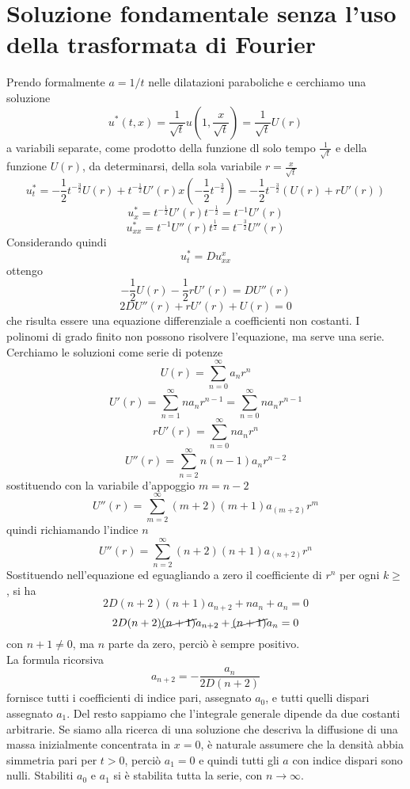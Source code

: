 \section{Soluzione fondamentale senza l'uso della trasformata di Fourier}
Prendo formalmente $a= 1/t$ nelle dilatazioni paraboliche e cerchiamo una
soluzione
\[
	u^*(t,x)= \frac{1}{\sqrt{t}}u \left( 1, \frac{x}{\sqrt{t}} \right)=
	\frac{1}{\sqrt{t}}U \left( r \right)
\]
a variabili separate, come prodotto della funzione dl solo tempo
$\frac{1}{\sqrt{t}}$ e della funzione $U(r)$, da determinarsi, della sola
variabile
$r=\frac{x}{\sqrt{t}}$
\[
	u^*_t= -\frac{1}{2}t^{-\frac{3}{2}} U(r)
	+ t^{-\frac{1}{2}}U'(r) x \left( -\frac{1}{2}t^{-\frac{3}{2}} \right)
	= -\frac{1}{2}t^{-\frac{3}{2}} \left( U(r)+ rU'(r) \right)
\]
\[
	u^*_x= t^{-\frac{1}{2}}U'(r)t^{-\frac{1}{2}}=
	t^{-1} U'(r)
\]
\[
	u^*_{xx}=t^{-1}U''(r)t^{\frac{1}{2}}=
	t^{-\frac{3}{2}}U''(r)
\]
Considerando quindi
\[
	u^*_t=Du^x_{xx}
\]
ottengo
\[
	-\frac{1}{2} U(r) -\frac{1}{2}rU'(r)= DU''(r)
\]
\[
	2DU''(r)+ rU'(r)+ U(r)= 0
\]
che risulta essere una equazione differenziale a coefficienti non costanti.
I polinomi di grado finito non possono risolvere l'equazione, ma serve una
serie.
Cerchiamo le soluzioni come serie di potenze
\[
	U(r)= \sum_{n=0}^{\infty}a_n r^n
\]
\[
	U'(r)= \sum_{n=1}^{\infty} n a_n r^{n-1}
	= \sum_{n=0}^{\infty} n a_n r^{n-1}
\]
\[
	rU'(r)= \sum_{n=0}^{\infty} na_n r^n
\]
\[
	U''(r)=\sum_{n=2}^{\infty} n(n-1)a_n r^{n-2}
\]
sostituendo con la variabile d'appoggio $m=n-2$
\[
	U''(r)=\sum_{m=2}^{\infty} (m+2)(m+1)a_(m+2) r^{m}
\]
quindi richiamando l'indice $n$
\[
	U''(r)=\sum_{n=2}^{\infty} (n+2)(n+1)a_(n+2) r^{n}
\]
Sostituendo nell'equazione ed eguagliando a zero il coefficiente di $r^n$ per
ogni $k \geq $, si ha
\[
	2D(n+2)(n+1)a_{n+2}+ na_n+ a_n = 0
\]
\[
	2D(n+2)\cancel{(n+1)}a_{n+2}+ \cancel{(n+1)}a_n=0
\]
con $n+1 \neq 0$, ma $n$ parte da zero, perci\`o \`e sempre positivo.\\
La formula ricorsiva
\[
	a_{n+2}= -\frac{a_n}{2D(n+2)}
\]
fornisce tutti i coefficienti di indice pari, assegnato $a_0$, e tutti quelli
dispari assegnato $a_1$.
Del resto sappiamo che l'integrale generale dipende da due costanti arbitrarie.
Se siamo alla ricerca di una soluzione che descriva la diffusione di una massa
inizialmente concentrata in $x=0$, \`e naturale assumere che la densit\`a abbia
simmetria pari per $t>0$, perci\`o $a_1=0$ e quindi tutti gli $a$ con indice
dispari sono nulli.
Stabiliti $a_0$ e $a_1$ si \`e stabilita tutta la serie, con $n\rightarrow
\infty$.\\
